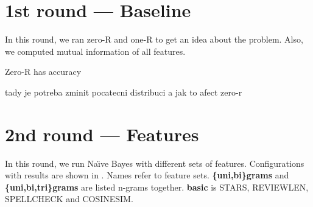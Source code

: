 \section{1st round --- Baseline}

In this round, we ran zero-R and one-R to get an idea about the problem.
Also, we computed mutual information of all features.

Zero-R has accuracy

tady je potreba zminit pocatecni distribuci a jak to afect zero-r


\section{2nd round --- Features}

In this round, we run Na\"{\i}ve Bayes with different sets of features.
Configurations with results are shown in .
Names refer to feature sets.
\textbf{\{uni,bi\}grams} and \textbf{\{uni,bi,tri\}grams} are listed n-grams together.
\textbf{basic} is STARS, REVIEWLEN, SPELLCHECK and COSINESIM.

